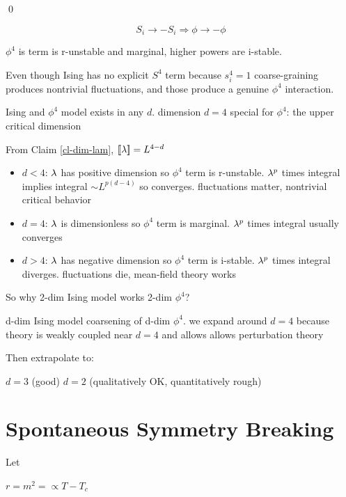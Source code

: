 \documentclass[12pt]{report}
\begin{document}
\beq
{}
\eeq
\qed

 $$
S_i \to -S_i \Rightarrow \phi \to -\phi
 $$


  $ \phi^4 $ is   term is r-unstable and marginal,
  higher powers are   i-stable.



Even though Ising has no explicit $ S^4 $ term because
 $
s_i^4 = 1
 $
coarse-graining produces   nontrivial fluctuations, and those produce a genuine $ \phi^4 $ interaction.

  Ising and $\phi^4$ model exists in any $d$. dimension $d=4$
  special for $\phi^4$:
 the   upper critical dimension 



From Claim \ref{cl-dim-lam},
$[\![ \lambda ]\!]=L^{4-d}$

\begin{itemize}
 \item $ d < 4 $:
  $ \lambda $ has   positive dimension   so $\phi^4$ term is  r-unstable.
  $\lambda^p$
  times integral
implies integral $\sim L^{p(d-4)}$
so converges.   fluctuations matter, nontrivial critical behavior

\item  $ d = 4 $:
  $ \lambda $ is   dimensionless  so $\phi^4$ term is marginal. $\lambda^p$ times integral
usually converges

\item  $ d > 4 $:
  $ \lambda $ has negative dimension  so $\phi^4$ term is i-stable.
$\lambda^p$ times integral 
diverges. 
  fluctuations die, mean-field theory works
\end{itemize}





 So why 2-dim Ising model works 2-dim $ \phi^4 $?


d-dim Ising model coarsening of d-dim $ \phi^4 $. we expand around $d=4$ because
  theory is weakly coupled near $ d=4 $ and allows
  allows perturbation theory

Then extrapolate to:

  $ d=3 $ (good)
  $ d=2 $ (qualitatively OK, quantitatively rough)



\section{Spontaneous Symmetry Breaking}

Let

$r=m^2=\propto T-T_c$
\end{document}
